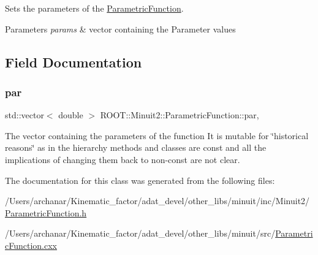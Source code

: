 Sets the parameters of the \mbox{\hyperlink{classROOT_1_1Minuit2_1_1ParametricFunction}{Parametric\+Function}}.


\begin{DoxyParams}{Parameters}
{\em params} & vector containing the Parameter values \\
\hline
\end{DoxyParams}


\subsection{Field Documentation}
\mbox{\label{classROOT_1_1Minuit2_1_1ParametricFunction_aae3e17582748a80c3ff5eef35b8ca9ca}} 
\subsubsection{\texorpdfstring{par}{par}}
{\footnotesize\ttfamily std\+::vector$<$ double $>$ R\+O\+O\+T\+::\+Minuit2\+::\+Parametric\+Function\+::par\hspace{0.3cm}{\ttfamily [mutable]}, {\ttfamily [protected]}}

The vector containing the parameters of the function It is mutable for \char`\"{}historical reasons\char`\"{} as in the hierarchy methods and classes are const and all the implications of changing them back to non-\/const are not clear. 

The documentation for this class was generated from the following files\+:\begin{DoxyCompactItemize}
\item 
/\+Users/archanar/\+Kinematic\+\_\+factor/adat\+\_\+devel/other\+\_\+libs/minuit/inc/\+Minuit2/\mbox{\hyperlink{other__libs_2minuit_2inc_2Minuit2_2ParametricFunction_8h}{Parametric\+Function.\+h}}\item 
/\+Users/archanar/\+Kinematic\+\_\+factor/adat\+\_\+devel/other\+\_\+libs/minuit/src/\mbox{\hyperlink{ParametricFunction_8cxx}{Parametric\+Function.\+cxx}}\end{DoxyCompactItemize}
